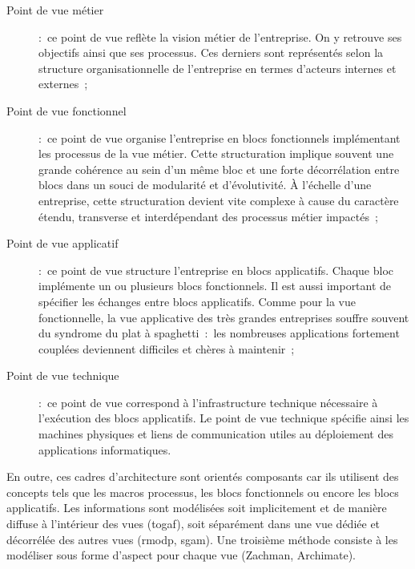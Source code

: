 \begin{description}

    \item[Point de vue métier]:~ce point de vue reflète la vision métier de
    l'entreprise. On y retrouve ses objectifs ainsi que ses processus. Ces
    derniers sont représentés selon la structure organisationnelle de
    l'entreprise en termes d'acteurs internes et externes~;

    \item[Point de vue fonctionnel]:~ce point de vue organise l'entreprise en
    blocs fonctionnels implémentant les processus de la vue métier. Cette
    structuration implique souvent une grande cohérence au sein d'un même bloc
    et une forte décorrélation entre blocs dans un souci de modularité et
    d'évolutivité. À l'échelle d'une entreprise, cette structuration devient
    vite complexe à cause du caractère étendu, transverse et interdépendant des
    processus métier impactés~;

    \item[Point de vue applicatif]:~ce point de vue structure l'entreprise en
    blocs applicatifs. Chaque bloc implémente un ou plusieurs blocs
    fonctionnels. Il est aussi important de spécifier les échanges entre blocs
    applicatifs. Comme pour la vue fonctionnelle, la vue applicative des très
    grandes entreprises souffre souvent du syndrome du plat à spaghetti~:~les
    nombreuses applications fortement couplées deviennent difficiles et
    chères à maintenir~;

    \item[Point de vue technique]:~ce point de vue correspond à
    l'infrastructure technique nécessaire à l'exécution des blocs applicatifs.
    Le point de vue technique spécifie ainsi les machines physiques et liens de
    communication utiles au déploiement des applications informatiques. 

\end{description}

En outre, ces cadres d'architecture sont orientés composants car ils utilisent
des concepts tels que les macros processus, les blocs fonctionnels ou encore
les blocs applicatifs. Les informations sont modélisées soit implicitement et
de manière diffuse à l'intérieur des vues (\gls{togaf}), soit séparément dans une vue
dédiée et décorrélée des autres vues (\gls{rmodp}, \gls{sgam}). Une troisième
méthode consiste à les modéliser sous forme d'aspect pour chaque vue (Zachman,
Archimate).

